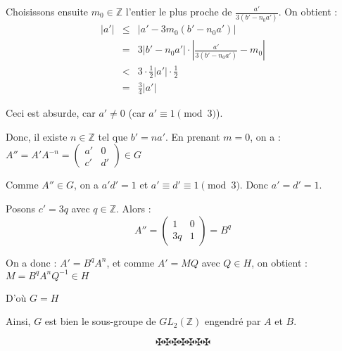 Choisissons ensuite $m_0 \in \mathbb{Z}$ l'entier le plus proche de
$\frac{a'}{3 (b' - n_0 a')}$. On obtient :
\begin{eqnarray*}
  |a' | & \leqslant & |a' - 3 m_0 (b' - n_0 a') |\\
  & = & 3| b' - n_0 a' | \cdot | \frac{a'}{3 (b' - n_0 a')} - m_0 |\\
  & < & 3 \cdot \frac{1}{2} |a' | \cdot \frac{1}{2}\\
  & = & \frac{3}{4} |a' |
\end{eqnarray*}


Ceci est absurde, car $a' \neq 0$ (car $a' \equiv 1 \pmod{3}$).

Donc, il existe $n \in \mathbb{Z}$ tel que $b' = na'$. En prenant $m = 0$, on
a : $A'' = A' A^{- n} = \left(\begin{array}{cc}
  a' & 0\\
  c' & d'
\end{array}\right) \in G$

Comme $A'' \in G$, on a $a' d' = 1$ et $a' \equiv d' \equiv 1 \pmod{3}$. Donc
$a' = d' = 1$.

Posons $c' = 3 q$ avec $q \in \mathbb{Z}$. Alors :
\[ A'' = \left(\begin{array}{cc}
     1 & 0\\
     3 q & 1
   \end{array}\right) = B^q \]


On a donc : $A' = B^q A^n$, et comme $A' = MQ$ avec $Q \in H$, on obtient : $M
= B^q A^n Q^{- 1} \in H$

D'o{\`u} $G = H$

Ainsi, $G$ est bien le sous-groupe de $GL_2 (\mathbb{Z})$ engendr{\'e} par $A$
et $B$.


\[ \maltese \maltese \maltese \maltese \maltese \maltese \maltese \]
